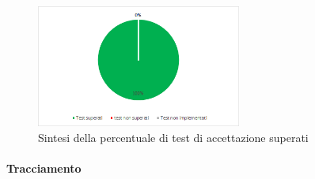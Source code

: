 	\begin{figure}[H]
		\centering 
		\includegraphics[width=0.6\textwidth]{Images/TA.png}
		\caption{Sintesi della percentuale di test di accettazione superati}
		\label{TA} 
	\end{figure}	
	
	\paragraph{Tracciamento} \Spazio
	
